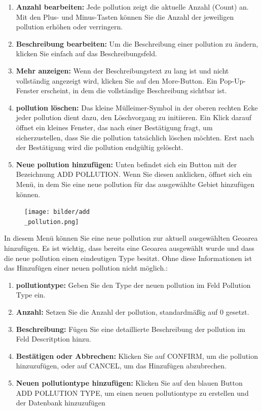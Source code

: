 \documentclass[a4paper,12pt]{article}
\begin{document}
\begin{enumerate}
    \item \textbf{Anzahl bearbeiten:} Jede \gls{pollution} zeigt die aktuelle Anzahl (Count) an. Mit den Plus- und Minus-Tasten können Sie die Anzahl der jeweiligen \gls{pollution} erhöhen oder verringern.
    \item \textbf{Beschreibung bearbeiten:} Um die Beschreibung einer \gls{pollution} zu ändern, klicken Sie einfach auf das Beschreibungsfeld. 
    \item \textbf{Mehr anzeigen:} Wenn der Beschreibungstext zu lang ist und nicht vollständig angezeigt wird, klicken Sie auf den \glqq More\grqq{}-Button. Ein Pop-Up-Fenster erscheint, in dem die vollständige Beschreibung sichtbar ist.
   \item \textbf{\gls{pollution} löschen:} Das kleine Mülleimer-Symbol in der oberen rechten Ecke jeder \gls{pollution} dient dazu, den Löschvorgang zu initiieren. Ein Klick darauf öffnet ein kleines Fenster, das nach einer Bestätigung fragt, um sicherzustellen, dass Sie die \gls{pollution} tatsächlich löschen möchten. Erst nach der Bestätigung wird die \gls{pollution} endgültig gelöscht.
    \item \textbf{Neue \gls{pollution} hinzufügen:} Unten befindet sich ein Button mit der Bezeichnung \glqq ADD POLLUTION\grqq{}. Wenn Sie diesen anklicken, öffnet sich ein Menü, in dem Sie eine neue \gls{pollution} für das ausgewählte Gebiet hinzufügen können.
\end{enumerate}

\begin{figure}[h]
\centering
\texttt{[image: bilder/add\\\_pollution.png]}
\end{figure}

\noindent In diesem Menü können Sie eine neue \gls{pollution} zur aktuell ausgewählten Geoarea hinzufügen. Es ist wichtig, dass bereits eine Geoarea ausgewählt wurde und dass die neue \gls{pollution} einen eindeutigen Type besitzt. Ohne diese Informationen ist das Hinzufügen einer neuen \gls{pollution} nicht möglich.:
\begin{enumerate}
    \item \textbf{\gls{pollutiontype}:} Geben Sie den Type der neuen \gls{pollution} im Feld \glqq Pollution Type\grqq{} ein.
    \item \textbf{Anzahl:} Setzen Sie die Anzahl der \gls{pollution}, standardmäßig auf 0 gesetzt.
    \item \textbf{Beschreibung:} Fügen Sie eine detaillierte Beschreibung der \gls{pollution} im Feld \glqq Descritption\grqq{} hinzu.
    \item \textbf{Bestätigen oder Abbrechen:} Klicken Sie auf \glqq CONFIRM\grqq{}, um die \gls{pollution} hinzuzufügen, oder auf \glqq CANCEL\grqq{}, um das Hinzufügen abzubrechen.
    \item\textbf{Neuen \gls{pollutiontype} hinzufügen:} Klicken Sie auf den blauen Button \glqq ADD POLLUTION TYPE\grqq{}, um einen neuen \gls{pollutiontype} zu erstellen und der Datenbank hinzuzufügen
\end{enumerate}
\end{document}
